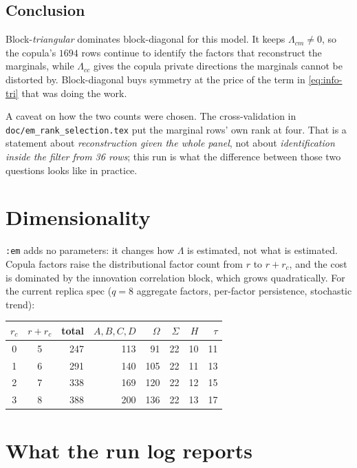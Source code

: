 \documentclass[11pt]{article}
\newcommand{\code}[1]{\texttt{#1}}
\begin{document}
\subsection{Conclusion}

Block-\emph{triangular} dominates block-diagonal for this model. It keeps
$\Lambda_{cm} \neq 0$, so the copula's $1694$ rows continue to identify the
factors that reconstruct the marginals, while $\Lambda_{cc}$ gives the copula
private directions the marginals cannot be distorted by. Block-diagonal buys
symmetry at the price of the term in \eqref{eq:info-tri} that was doing the
work.

A caveat on how the two counts were chosen. The cross-validation in
\code{doc/em\_rank\_selection.tex} put the marginal rows' own rank at four. That
is a statement about \emph{reconstruction given the whole panel}, not about
\emph{identification inside the filter from 36 rows}; this run is what the
difference between those two questions looks like in practice.

\section{Dimensionality}

\code{:em} adds no parameters: it changes how $\Lambda$ is estimated, not what
is estimated. Copula factors raise the distributional factor count from $r$ to
$r + r_c$, and the cost is dominated by the innovation correlation block, which
grows quadratically. For the current replica spec ($q = 8$ aggregate factors,
per-factor persistence, stochastic trend):

\begin{center}
\begin{tabular}{ccrrrrrr}
\toprule
$r_c$ & $r + r_c$ & total & $A,B,C,D$ & $\Omega$ & $\Sigma$ & $H$ & $\tau$ \\
\midrule
0 & 5 & 247 & 113 & \phantom{0}91 & 22 & 10 & 11 \\
1 & 6 & 291 & 140 & 105 & 22 & 11 & 13 \\
2 & 7 & 338 & 169 & 120 & 22 & 12 & 15 \\
3 & 8 & 388 & 200 & 136 & 22 & 13 & 17 \\
\bottomrule
\end{tabular}
\end{center}

\section{What the run log reports}
\end{document}
